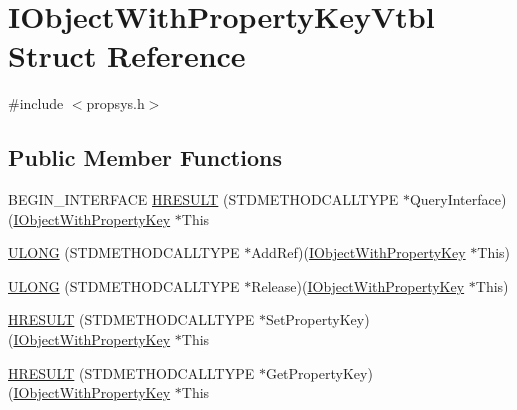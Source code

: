 \hypertarget{struct_i_object_with_property_key_vtbl}{}\section{I\+Object\+With\+Property\+Key\+Vtbl Struct Reference}
\label{struct_i_object_with_property_key_vtbl}


{\ttfamily \#include $<$propsys.\+h$>$}

\subsection*{Public Member Functions}
\begin{DoxyCompactItemize}
\item 
B\+E\+G\+I\+N\+\_\+\+I\+N\+T\+E\+R\+F\+A\+CE \hyperlink{struct_i_object_with_property_key_vtbl_a37460863dca62dfaa239429d6726d32a}{H\+R\+E\+S\+U\+LT} (S\+T\+D\+M\+E\+T\+H\+O\+D\+C\+A\+L\+L\+T\+Y\+PE $\ast$Query\+Interface)(\hyperlink{propsys_8h_a7b02f76231c998d513cc34e9e5766b18}{I\+Object\+With\+Property\+Key} $\ast$This
\item 
\hyperlink{struct_i_object_with_property_key_vtbl_a11a2862e59f3bee4bc7329c5918a30b3}{U\+L\+O\+NG} (S\+T\+D\+M\+E\+T\+H\+O\+D\+C\+A\+L\+L\+T\+Y\+PE $\ast$Add\+Ref)(\hyperlink{propsys_8h_a7b02f76231c998d513cc34e9e5766b18}{I\+Object\+With\+Property\+Key} $\ast$This)
\item 
\hyperlink{struct_i_object_with_property_key_vtbl_a22909cde30d962f3c2e223db63b7f71e}{U\+L\+O\+NG} (S\+T\+D\+M\+E\+T\+H\+O\+D\+C\+A\+L\+L\+T\+Y\+PE $\ast$Release)(\hyperlink{propsys_8h_a7b02f76231c998d513cc34e9e5766b18}{I\+Object\+With\+Property\+Key} $\ast$This)
\item 
\hyperlink{struct_i_object_with_property_key_vtbl_a0c76b62be23efc4fdee81d83c8884077}{H\+R\+E\+S\+U\+LT} (S\+T\+D\+M\+E\+T\+H\+O\+D\+C\+A\+L\+L\+T\+Y\+PE $\ast$Set\+Property\+Key)(\hyperlink{propsys_8h_a7b02f76231c998d513cc34e9e5766b18}{I\+Object\+With\+Property\+Key} $\ast$This
\item 
\hyperlink{struct_i_object_with_property_key_vtbl_a95b042e6201a3a61177b29bd5bc9fa23}{H\+R\+E\+S\+U\+LT} (S\+T\+D\+M\+E\+T\+H\+O\+D\+C\+A\+L\+L\+T\+Y\+PE $\ast$Get\+Property\+Key)(\hyperlink{propsys_8h_a7b02f76231c998d513cc34e9e5766b18}{I\+Object\+With\+Property\+Key} $\ast$This
\end{DoxyCompactItemize}
